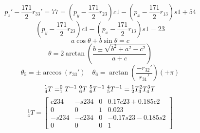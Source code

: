 \documentclass[12pt]{article}
\begin{document}
\[
    p_z'-\frac{171}{2}r_{33}'=77=(p_y-\frac{171}{2}r_{23})c1-(p_x-\frac{171}{2}r_{13})s1+54
\]
\[
    (p_y-\frac{171}{2}r_{23})c1-(p_x-\frac{171}{2}r_{13})s1=23
\]
\[
    a\cos \theta +b\sin \theta =c   
\]
\[
    \theta= 2\arctan\left(\frac{b\pm \sqrt{b^2+a^2-c^2}}{a+c}\right)   
\]
\[
    \theta_5=\pm \arccos (r_{33}') \quad \theta_6=\arctan \left(\frac{-r_{32}'}{r_{31}'}\right)(+\pi)
\]
\[
    ^1_4T=  ^0_1T^{-1}\ ^0_6T\ ^5_6T^{-1}\ ^4_5T^{-1}=\nonscript^1_2T^2_3T^3_4T
\]
\[
    ^1_4T= \left[
        \begin{matrix}
            c234 & -s234 & 0 & 0.17c23+0.185c2 \\
            0 & 0 & 1& 0.023\\
            -s234 & -c234 &0 &-0.17s23-0.185s2 \\
            0      & 0      & 0      & 1
        \end{matrix}  \right]
\]
\end{document}
